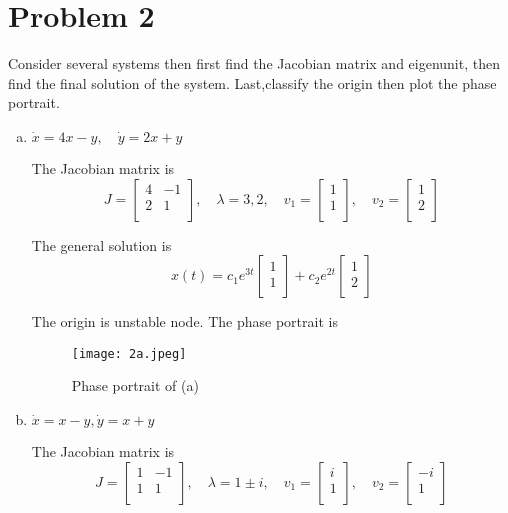 \documentclass[12pt]{exam}
\begin{document}
\section*{Problem 2}
Consider several systems then first find the Jacobian matrix and eigenunit, then find the final solution of the system. Last,classify the origin then plot the phase portrait.

\begin{enumerate}[(a)]
	\item $\dot{x} = 4x-y, \quad \dot{y}=2x+y$
	
	The Jacobian matrix is
	\[ J = \begin{bmatrix}
		4 & -1 \\
		2 & 1 \\
	\end{bmatrix} , \quad \lambda = 3, 2 , \quad v_1= \begin{bmatrix}
	1 \\
	1 \\
	\end{bmatrix} , \quad v_2 = \begin{bmatrix}
	1 \\
	2 \\
	\end{bmatrix} \]

	The general solution is
	\[ x(t) = c_1e^{3t} \begin{bmatrix}
		1 \\
		1 \\
	\end{bmatrix} + c_2e^{2t} \begin{bmatrix}
		1 \\
		2 \\
	\end{bmatrix} \]

	The origin is unstable node. The phase portrait is
	\begin{figure}[h]
		\centering
		\texttt{[image: 2a.jpeg]}
		\caption{Phase portrait of (a)}
		\label{fig:2a}
	
	\end{figure}

	\item $\dot{x} = x-y, \dot{y} = x+y$

	The Jacobian matrix is
	\[ J = \begin{bmatrix}
		1 & -1 \\
		1 & 1 \\
	\end{bmatrix} , \quad \lambda = 1\pm i , \quad v_1= \begin{bmatrix}
	i \\
	1 \\
	\end{bmatrix} , \quad v_2 = \begin{bmatrix}
	-i \\
	1 \\
	\end{bmatrix} \]


\end{enumerate}
\end{document}
